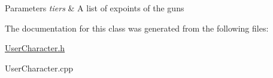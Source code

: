 \begin{DoxyParams}{Parameters}
{\em tiers} & A list of expoints of the guns \\
\hline
\end{DoxyParams}


The documentation for this class was generated from the following files\+:\begin{DoxyCompactItemize}
\item 
\hyperlink{_user_character_8h}{User\+Character.\+h}\item 
User\+Character.\+cpp\end{DoxyCompactItemize}
